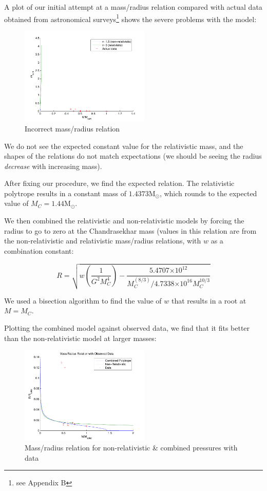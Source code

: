 \documentclass[twoside]{article}
\providecommand{\e}[1]{\ensuremath{\times 10^{#1}}}
\begin{document}
\begin{multicols}{2}
A plot of our initial attempt at a mass/radius relation compared with actual
data obtained from astronomical surveys\footnote{see Appendix B} shows the severe problems with the
model:

\begin{figure}[H]
    \caption{Incorrect mass/radius relation}
    \includegraphics[width=0.55\textwidth]{mr-data.pdf}
\end{figure}

We do not see the expected constant value for the relativistic mass, and the
shapes of the relations do not match expectations (we should be seeing the
radius \emph{decrease} with increasing mass).

After fixing our procedure, we find the expected relation. The relativistic
polytrope results in a constant mass of \(1.4373 \textrm{M}_{\odot}\), which rounds to
the expected value of \(M_C=1.44 \textrm{M}_{\odot}\).

We then combined the relativistic and non-relativistic models by forcing the
radius to go to zero at the Chandrasekhar mass (values in this relation are from
the non-relativistic and relativistic mass/radius relations, with \(w\) as a
combination constant:

\[ R=\sqrt{w\left(\frac{1}{G^2M_C^4}\right) -
\frac{5.4707\e{12}}{M_C^(8/3)/4.7338\e{16}M_C^{10/3}}} \]

We used a bisection algorithm to find the value of \(w\) that results in a root
at \(M=M_C\).

Plotting the combined model against observed data, we find that it fits better
than the non-relativistic model at larger masses:

\begin{figure}[H]
    \caption{Mass/radius relation for non-relativistic \& combined pressures
    with data}
    \includegraphics[width=0.55\textwidth]{mr_data_fixed.pdf}
\end{figure}


\end{multicols}
\end{document}
